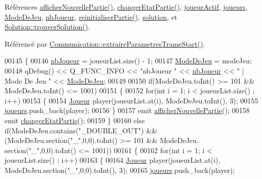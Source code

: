 Références \hyperlink{class_darts_a650d6efdef25756bfbbacb0bb3549c43}{afficher\+Nouvelle\+Partie()}, \hyperlink{class_darts_a25cf64530c84d7aa261a4806e88dcd6e}{changer\+Etat\+Partie()}, \hyperlink{darts_8h_source_l00076}{joueur\+Actif}, \hyperlink{darts_8h_source_l00073}{joueurs}, \hyperlink{darts_8h_source_l00081}{Mode\+De\+Jeu}, \hyperlink{darts_8h_source_l00075}{nb\+Joueur}, \hyperlink{darts_8cpp_source_l00184}{reinitialiser\+Partie()}, \hyperlink{darts_8h_source_l00072}{solution}, et \hyperlink{solution_8cpp_source_l00296}{Solution\+::trouver\+Solution()}.



Référencé par \hyperlink{communication_8cpp_source_l00243}{Communication\+::extraire\+Parametres\+Trame\+Start()}.


\begin{DoxyCode}
00145 \{
00146     \hyperlink{class_darts_ac5ae0e3546d00f59adba76c4ece71725}{nbJoueur} = joueurList.size() - 1;
00147     \hyperlink{class_darts_a281fd6201343dfb65ab81c93fd60f786}{ModeDeJeu} = modeJeu;
00148     qDebug() << Q\_FUNC\_INFO << \textcolor{stringliteral}{"nbJoueur "} << \hyperlink{class_darts_ac5ae0e3546d00f59adba76c4ece71725}{nbJoueur} << \textcolor{stringliteral}{" | Mode De Jeu "} << 
      \hyperlink{class_darts_a281fd6201343dfb65ab81c93fd60f786}{ModeDeJeu};
00149 
00150     \textcolor{keywordflow}{if}(ModeDeJeu.toInt() >= 101 && ModeDeJeu.toInt() <= 1001)
00151     \{
00152         \textcolor{keywordflow}{for}(\textcolor{keywordtype}{int} i = 1; i < joueurList.size() ; i++)
00153         \{
00154             \hyperlink{class_joueur}{Joueur} player(joueurList.at(i), ModeDeJeu.toInt(), 3);
00155             \hyperlink{class_darts_a81bc116f3ae70cea1f492f87f01901c7}{joueurs}.push\_back(player);
00156         \}
00157         emit \hyperlink{class_darts_a650d6efdef25756bfbbacb0bb3549c43}{afficherNouvellePartie}();
00158         emit \hyperlink{class_darts_a25cf64530c84d7aa261a4806e88dcd6e}{changerEtatPartie}();
00159     \}
00160     \textcolor{keywordflow}{else} \textcolor{keywordflow}{if}(ModeDeJeu.contains(\textcolor{stringliteral}{"\_DOUBLE\_OUT"}) && (ModeDeJeu.section(\textcolor{stringliteral}{"\_"},0,0).toInt() >= 101 && ModeDeJeu.
      section(\textcolor{stringliteral}{"\_"},0,0).toInt() <= 1001))
00161     \{
00162         \textcolor{keywordflow}{for}(\textcolor{keywordtype}{int} i = 1; i < joueurList.size() ; i++)
00163         \{
00164             \hyperlink{class_joueur}{Joueur} player(joueurList.at(i), ModeDeJeu.section(\textcolor{stringliteral}{"\_"},0,0).toInt(), 3);
00165             \hyperlink{class_darts_a81bc116f3ae70cea1f492f87f01901c7}{joueurs}.push\_back(player);

\end{DoxyCode}
